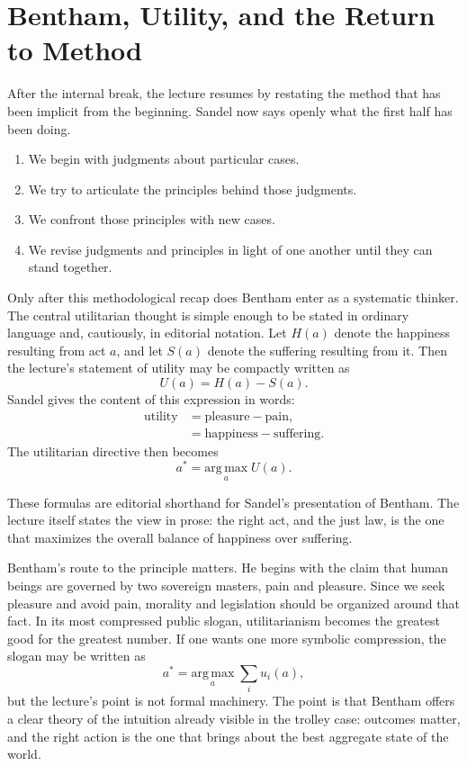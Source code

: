 \section{Bentham, Utility, and the Return to Method}

After the internal break, the lecture resumes by restating the method that has been implicit from the beginning. Sandel now says openly what the first half has been doing.

\begin{enumerate}
\item We begin with judgments about particular cases.
\item We try to articulate the principles behind those judgments.
\item We confront those principles with new cases.
\item We revise judgments and principles in light of one another until they can stand together.
\end{enumerate}

Only after this methodological recap does Bentham enter as a systematic thinker. The central utilitarian thought is simple enough to be stated in ordinary language and, cautiously, in editorial notation. Let \(H(a)\) denote the happiness resulting from act \(a\), and let \(S(a)\) denote the suffering resulting from it. Then the lecture's statement of utility may be compactly written as
\begin{equation}
U(a) = H(a) - S(a).
\end{equation}
Sandel gives the content of this expression in words:
\begin{align}
\text{utility} &= \text{pleasure} - \text{pain}, \\
               &= \text{happiness} - \text{suffering}.
\end{align}
The utilitarian directive then becomes
\begin{equation}
a^\ast = \underset{a}{\mathrm{arg\,max}}\; U(a).
\end{equation}

\begin{remark}
These formulas are editorial shorthand for Sandel's presentation of Bentham. The lecture itself states the view in prose: the right act, and the just law, is the one that maximizes the overall balance of happiness over suffering.
\end{remark}

Bentham's route to the principle matters. He begins with the claim that human beings are governed by two sovereign masters, pain and pleasure. Since we seek pleasure and avoid pain, morality and legislation should be organized around that fact. In its most compressed public slogan, utilitarianism becomes the greatest good for the greatest number. If one wants one more symbolic compression, the slogan may be written as
\begin{equation}
a^\ast = \underset{a}{\mathrm{arg\,max}}\; \sum_i u_i(a),
\end{equation}
but the lecture's point is not formal machinery. The point is that Bentham offers a clear theory of the intuition already visible in the trolley case: outcomes matter, and the right action is the one that brings about the best aggregate state of the world.

